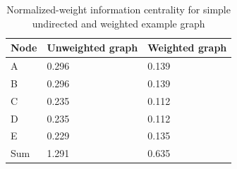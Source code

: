 \begin{table}[H]
	\centering
	\caption{Normalized-weight information centrality for simple undirected and weighted example graph}
	\label{tab:normalized_information_centrality}
	\begin{tabular}{|C{.2\linewidth}|C{.2\linewidth}|C{.2\linewidth}|}
		\hline Node & Unweighted graph & Weighted graph \\
		\hline A & 0.296 & 0.139 \\
		\hline B & 0.296 & 0.139 \\
		\hline C & 0.235 & 0.112 \\
		\hline D & 0.235 & 0.112 \\
		\hline E & 0.229 & 0.135 \\
		\hline Sum & 1.291 & 0.635 \\
		\hline
	\end{tabular}
\end{table}